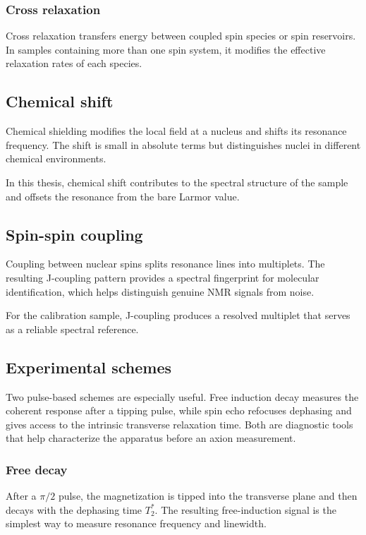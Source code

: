 \subsubsection{Cross relaxation}
Cross relaxation transfers energy between coupled spin species or spin reservoirs.
In samples containing more than one spin system, it modifies the effective relaxation rates of each species.

\subsection{Chemical shift}
Chemical shielding modifies the local field at a nucleus and shifts its resonance frequency.
The shift is small in absolute terms but distinguishes nuclei in different chemical environments.

In this thesis, chemical shift contributes to the spectral structure of the sample and offsets the resonance from the bare Larmor value.

\subsection{Spin-spin coupling}
Coupling between nuclear spins splits resonance lines into multiplets.
The resulting J-coupling pattern provides a spectral fingerprint for molecular identification, which helps distinguish genuine NMR signals from noise.

For the calibration sample, J-coupling produces a resolved multiplet that serves as a reliable spectral reference.

\subsection{Experimental schemes}
Two pulse-based schemes are especially useful.
Free induction decay measures the coherent response after a tipping pulse, while spin echo refocuses dephasing and gives access to the intrinsic transverse relaxation time.
Both are diagnostic tools that help characterize the apparatus before an axion measurement.

\subsubsection{Free decay}\label{sec:NMR:scheme:1Pulse}
After a $\pi/2$ pulse, the magnetization is tipped into the transverse plane and then decays with the dephasing time $T_2^*$.
The resulting free-induction signal is the simplest way to measure resonance frequency and linewidth.

